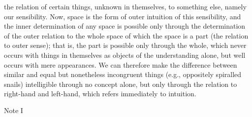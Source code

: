 the relation of certain things, unknown in themselves, to something
else, namely our sensibility. Now, space is the form of outer intuition
of this sensibility, and the inner determination of any space is possible
only through the determination of the outer relation to the whole space
of which the space is a part (the relation to outer sense); that is, the
part is possible only through the whole, which never occurs with things
in themselves as objects of the understanding alone, but well occurs
with mere appearances. We can therefore make the difference between
similar and equal but nonetheless incongruent things (e.g., oppositely
spiralled snails) intelligible through no concept alone, but only through
the relation to right-hand and left-hand, which refers immediately to
intuition.

Note I

